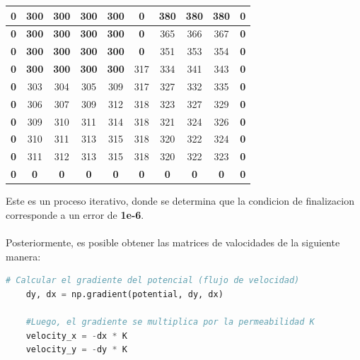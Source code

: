 \begin{center}
    \begin{tabular}{|c|c|c|c|c|c|c|c|c|c|} 
        \hline
        \textbf{0} & \textbf{300} & \textbf{300} & \textbf{300} & \textbf{300} & \textbf{0} & \textbf{380} & \textbf{380} & \textbf{380} & \textbf{0} \\
        \hline
        \textbf{0} & \textbf{300} & \textbf{300} & \textbf{300} & \textbf{300} & \textbf{0} & 365 & 366 & 367 & \textbf{0} \\
        \hline
        \textbf{0} & \textbf{300} & \textbf{300} & \textbf{300} & \textbf{300} & \textbf{0} & 351 & 353 & 354 & \textbf{0} \\
        \hline
        \textbf{0} & \textbf{300} & \textbf{300} & \textbf{300} & \textbf{300} & 317 & 334 & 341 & 343 & \textbf{0} \\
        \hline
        \textbf{0} & 303 & 304 & 305 & 309 & 317 & 327 & 332 & 335 & \textbf{0} \\
        \hline
        \textbf{0} & 306 & 307 & 309 & 312 & 318 & 323 & 327 & 329 & \textbf{0} \\
        \hline
        \textbf{0} & 309 & 310 & 311 & 314 & 318 & 321 & 324 & 326 & \textbf{0} \\
        \hline
        \textbf{0} & 310 & 311 & 313 & 315 & 318 & 320 & 322 & 324 & \textbf{0} \\
        \hline
        \textbf{0} & 311 & 312 & 313 & 315 & 318 & 320 & 322 & 323 & \textbf{0} \\
        \hline
        \textbf{0} & \textbf{0} & \textbf{0} & \textbf{0} & \textbf{0} & \textbf{0} & \textbf{0} & \textbf{0} & \textbf{0} & \textbf{0} \\
        \hline
    \end{tabular}         
\end{center}

Este es un proceso iterativo, donde se determina que la condicion de finalizacion corresponde a un error de \textbf{1e-6}.
\\ \\
Posteriormente, es posible obtener las matrices de valocidades de la siguiente manera:

\begin{lstlisting}[language=Python]
    # Calcular el gradiente del potencial (flujo de velocidad)
    dy, dx = np.gradient(potential, dy, dx)

    #Luego, el gradiente se multiplica por la permeabilidad K
    velocity_x = -dx * K 
    velocity_y = -dy * K
\end{lstlisting}


